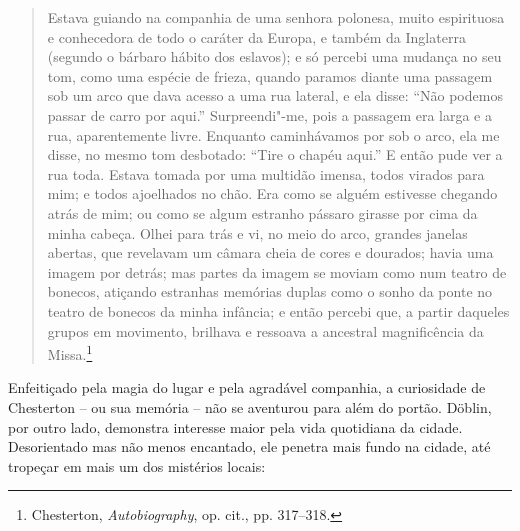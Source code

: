 \begin{quote}
Estava guiando na companhia de uma senhora polonesa, muito espirituosa e
conhecedora de todo o caráter da Europa, e também da Inglaterra (segundo
o bárbaro hábito dos eslavos); e só percebi uma mudança no seu tom, como
uma espécie de frieza, quando paramos diante uma passagem sob um arco
que dava acesso a uma rua lateral, e ela disse: ``Não podemos passar de
carro por aqui.'' Surpreendi"-me, pois a passagem era larga e a rua,
aparentemente livre. Enquanto caminhávamos por sob o arco, ela me disse,
no mesmo tom desbotado: ``Tire o chapéu aqui.'' E então pude ver a rua
toda. Estava tomada por uma multidão imensa, todos virados para mim; e
todos ajoelhados no chão. Era como se alguém estivesse chegando atrás de
mim; ou como se algum estranho pássaro girasse por cima da minha cabeça.
Olhei para trás e vi, no meio do arco, grandes janelas abertas, que
revelavam um câmara cheia de cores e dourados; havia uma imagem por
detrás; mas partes da imagem se moviam como num teatro de bonecos,
atiçando estranhas memórias duplas como o sonho da ponte no teatro de
bonecos da minha infância; e então percebi que, a partir daqueles grupos
em movimento, brilhava e ressoava a ancestral magnificência da
Missa.\footnote{Chesterton, \textit{Autobiography}, op. cit., pp. 317--318.}
\end{quote}

Enfeitiçado pela magia do lugar e pela agradável companhia, a
curiosidade de Chesterton -- ou sua memória -- não se aventurou para além do
portão. Döblin, por outro lado, demonstra interesse maior pela vida
quotidiana da cidade. Desorientado mas não menos encantado, ele penetra
mais fundo na cidade, até tropeçar em mais um dos mistérios locais:

